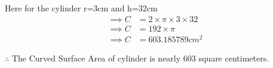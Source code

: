\documentclass[journal,12pt,twocolumn]{IEEEtran}
\begin{document}
\begin{enumerate}[label=(\roman*)]
		Here for the cylinder r=3cm and h=32cm\\
		\begin{align}	
		\implies C&=2 \times \pi \times 3 \times 32
			\\
		\implies C&=192 \times \pi 
			\\
		\implies C&=603.185789 cm^2 
		\end{align}
	
	\end{enumerate}
		$\therefore$ The Curved Surface Area of cylinder is nearly 603 square centimeters.
	\ifthenelse{\isundefined{\languageshorthands}}{}{\languageshorthands{\languagename}}\gnumericTableEnds
\end{document}

